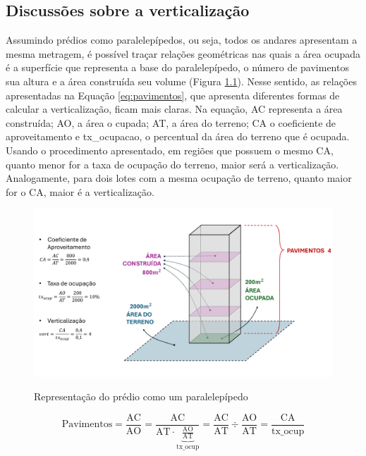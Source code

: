 \begin{apendicesenv}

\partapendices

\chapter{Discussões sobre a verticalização}
\label{appendix:verticalizacao}

Assumindo prédios como paralelepípedos, ou seja, todos os andares apresentam a mesma metragem, é possível traçar relações geométricas nas quais a área ocupada é a superfície que representa a base do paralelepípedo, o número de pavimentos sua altura e a área construída seu volume (Figura \ref{fig:desenho}). Nesse sentido, as relações apresentadas na Equação \ref{eq:pavimentos}, que apresenta diferentes formas de calcular a verticalização, ficam mais claras. Na equação, AC representa a área construída; AO, a área o cupada; AT, a área do terreno; CA o coeficiente de aproveitamento e tx\_ocupacao, o percentual da área do terreno que é ocupada. Usando o procedimento apresentado, em regiões que possuem o mesmo CA, quanto menor for a taxa de ocupação do terreno, maior será a verticalização. Analogamente, para dois lotes com a mesma ocupação de terreno, quanto maior for o CA, maior é a verticalização.

\begin{figure}[h]
    \centering
    \caption{Representação do prédio como um paralelepípedo}
    \includegraphics[width = \linewidth]{imagens/desenho.pdf}
    \label{fig:desenho}
\end{figure}

\begin{equation}
    \text{Pavimentos}=\frac{\text{AC}}{\text{AO}}=\frac{\text{AC}}{\text{AT}\cdot\underbrace{\frac{\text{AO}}{\text{AT}}}_\text{tx\_ocup}}=\frac{\text{AC}}{\text{AT}}\div\frac{\text{AO}}{\text{AT}}=\frac{\text{CA}}{\text{tx\_ocup}}
    \label{eq:pavimentos}
\end{equation}
    

\end{apendicesenv}
